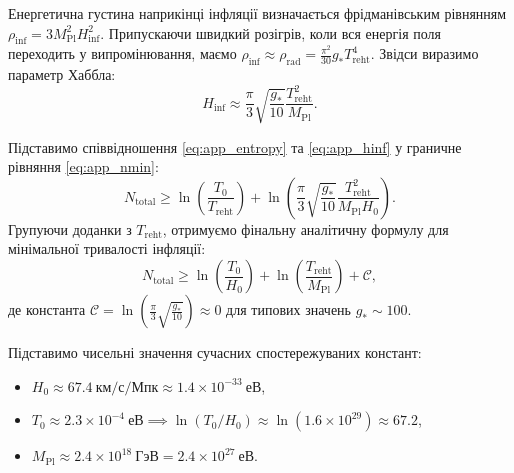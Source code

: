 \documentclass[12pt, a4paper]{article}
\begin{document}
Енергетична густина наприкінці інфляції визначається фрідманівським рівнянням $\rho_{\mathrm{inf}} = 3 M_{\mathrm{Pl}}^2 H_{\mathrm{inf}}^2$. Припускаючи швидкий розігрів, коли вся енергія поля переходить у випромінювання, маємо $\rho_{\mathrm{inf}} \approx \rho_{\mathrm{rad}} = \frac{\pi^2}{30} g_* T_{\mathrm{reht}}^4$. Звідси виразимо параметр Хаббла:
\begin{equation}
\label{eq:app_hinf}
H_{\mathrm{inf}} \approx \frac{\pi}{3} \sqrt{\frac{g_*}{10}} \frac{T_{\mathrm{reht}}^2}{M_{\mathrm{Pl}}}.
\end{equation}

Підставимо співвідношення \eqref{eq:app_entropy} та \eqref{eq:app_hinf} у граничне рівняння \eqref{eq:app_nmin}:
\begin{equation}
N_{\mathrm{total}} \ge \ln \left( \frac{T_0}{T_{\mathrm{reht}}} \right) + \ln \left( \frac{\pi}{3} \sqrt{\frac{g_*}{10}} \frac{T_{\mathrm{reht}}^2}{M_{\mathrm{Pl}} H_0} \right).
\end{equation}
Групуючи доданки з $T_{\mathrm{reht}}$, отримуємо фінальну аналітичну формулу для мінімальної тривалості інфляції:
\begin{equation}
\label{eq:app_final_n}
N_{\mathrm{total}} \ge \ln \left( \frac{T_0}{H_0} \right) + \ln \left( \frac{T_{\mathrm{reht}}}{M_{\mathrm{Pl}}} \right) + \mathcal{C},
\end{equation}
де константа $\mathcal{C} = \ln \left( \frac{\pi}{3} \sqrt{\frac{g_*}{10}} \right) \approx 0$ для типових значень $g_* \sim 100$.

Підставимо чисельні значення сучасних спостережуваних констант:
\begin{itemize}
    \item $H_0 \approx 67.4~\text{км/с/Мпк} \approx 1.4 \times 10^{-33}~\text{еВ}$,
    \item $T_0 \approx 2.3 \times 10^{-4}~\text{еВ} \implies \ln(T_0 / H_0) \approx \ln(1.6 \times 10^{29}) \approx 67.2$,
    \item $M_{\mathrm{Pl}} \approx 2.4 \times 10^{18}~\text{ГэВ} = 2.4 \times 10^{27}~\text{еВ}$.
\end{itemize}
\end{document}
